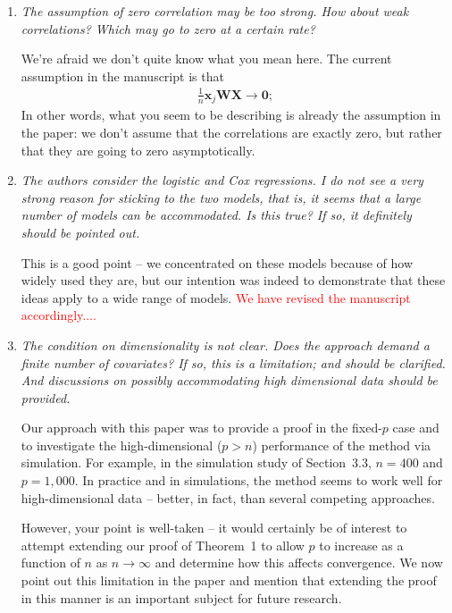 \documentclass{article}
\providecommand{\note}[1]{\textcolor{red}{#1}}
\begin{document}
\begin{enumerate}

\item {\em The assumption of zero correlation may be too strong. How about weak correlations? Which may go to zero at a certain rate?}

  We're afraid we don't quite know what you mean here.  The current assumption in the manuscript is that
  \begin{align*}
    \frac{1}{n}\mathbf{x}_j\mathbf{W}\mathbf{X} \to \mathbf{0};
  \end{align*}
  In other words, what you seem to be describing is already the assumption in the paper: we don't assume that the correlations are exactly zero, but rather that they are going to zero asymptotically.  

\item {\em The authors consider the logistic and Cox regressions. I do not see a very strong reason for sticking to the two models, that is, it seems that a large number of models can be accommodated. Is this true? If so, it definitely should be pointed out.}

  This is a good point -- we concentrated on these models because of how widely used they are, but our intention was indeed to demonstrate that these ideas apply to a wide range of models.  \note{We have revised the manuscript accordingly....}

\item {\em The condition on dimensionality is not clear. Does the approach demand a finite number of covariates? If so, this is a limitation; and should be clarified. And discussions on possibly accommodating high dimensional data should be provided.}

  Our approach with this paper was to provide a proof in the fixed-$p$ case and to investigate the high-dimensional ($p>n$) performance of the method via simulation.  For example, in the simulation study of Section~3.3, $n=400$ and $p=1,000$.  In practice and in simulations, the method seems to work well for high-dimensional data -- better, in fact, than several competing approaches.

  However, your point is well-taken -- it would certainly be of interest to attempt extending our proof of Theorem~1 to allow $p$ to increase as a function of $n$ as $n \to \infty$ and determine how this affects convergence.  We now point out this limitation in the paper and mention that extending the proof in this manner is an important subject for future research.

\end{enumerate}

%
%
\end{document}
